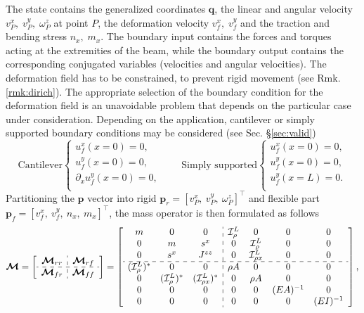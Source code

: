 \documentclass{svjour3}                     %
\newcommand{\secref}[1]{\S\ref{#1}}
\begin{document}
The state contains the generalized coordinates $\bm{q}$, the linear and angular velocity $v_P^x, \; v_P^y, \; \omega_P^z$ at point $P$, the deformation velocity $ v_f^x, \; v_f^y$ and the traction and bending stress $n_x, \; m_{x}$. The boundary input contains the forces and torques acting at the extremities of the beam, while the boundary output contains the corresponding conjugated variables (velocities and angular velocities).
The deformation field has to be constrained, to prevent rigid movement (see Rmk. \ref{rmk:dirich}). The appropriate selection of the boundary condition for the deformation field is an unavoidable problem that depends on the particular case under consideration.  Depending on the application, cantilever or simply supported boundary conditions may be considered (see Sec. \secref{sec:valid})
\begin{equation*}
\text{Cantilever}
\begin{cases}
u_f^x(x=0) = 0, \\
u_f^y(x=0) = 0, \\
\partial_x u_f^y(x=0) = 0, \\
\end{cases} \qquad 
\text{Simply supported}
\begin{cases}
u_f^x(x=0) = 0, \\
u_f^y(x=0) = 0, \\
u_f^y(x=L) = 0. \\
\end{cases}
\end{equation*}
Partitioning the $\bm{p}$ vector into rigid $\bm{p}_r = [v_P^x, \ v_P^y, \ \omega_P^z]^\top$ and flexible part $\bm{p}_f = [v_f^x, \ v_f^y, \ n_x, \ m_{x}]^\top$, the mass operator is then formulated as follows
\begin{equation}
\label{eq:EB_M}
\bm{\mathcal{M}} = 
\left[ \begin{array}{c:c}
\bm{\mathcal{M}}_{rr} & \bm{\mathcal{M}}_{rf} \\
\hdashline
\bm{\mathcal{M}}_{fr} & \bm{\mathcal{M}}_{ff} \\
\end{array} \right] = 
\left[ \begin{array}{ccc:cccc}
m & 0 & 0 & \mathcal{I}_\rho^L & 0 & 0 & 0 \\
0 & m & s^x & 0 & \mathcal{I}_\rho^L & 0 & 0 \\
0 & s^x & J^{zz} & 0 & \mathcal{I}_{\rho x}^{L} & 0 & 0 \\
\hdashline 
(\mathcal{I}_\rho^{L})^* & 0 & 0 & \rho A & 0 & 0 & 0  \\
0 & (\mathcal{I}_\rho^{L})^* & (\mathcal{I}_{\rho x}^{L})^* & 0 & \rho A & 0 & 0  \\
0 & 0 & 0 & 0 & 0 & (EA)^{-1} & 0 \\
0 & 0 & 0 & 0 & 0 & 0 & (EI)^{-1} \\
\end{array} \right],
\end{equation}
\end{document}
